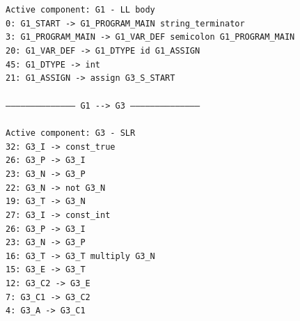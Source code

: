 \begin{priklad}
  \texttt{Active component: G1 - LL body \\
    \phantom{mm}0:\phantom{mmmmmmmmmmmm}              G1\_START -> G1\_PROGRAM\_MAIN string\_terminator \\
    \phantom{mm}3:\phantom{mmmmm}       G1\_PROGRAM\_MAIN -> G1\_VAR\_DEF semicolon G1\_PROGRAM\_MAIN \\
    \phantom{mm}20:\phantom{mmmmmmmmm}           G1\_VAR\_DEF -> G1\_DTYPE id G1\_ASSIGN \\
    \phantom{mm}45:\phantom{mmmmmmmmmmm}             G1\_DTYPE -> int \\
    \phantom{mm}21:\phantom{mmmmmmmmmm}            G1\_ASSIGN -> assign G3\_S\_START \\
  \ \\
  ------------------------------------------    G1   -\-->   G3    ------------------------------------------ \\
  \ \\ \newpage
  Active component: G3 - SLR \\
    \phantom{mm}32:\phantom{mmmmmmmmmmmmmmm}                 G3\_I -> const\_true \\
    \phantom{mm}26:\phantom{mmmmmmmmmmmmmmm}                 G3\_P -> G3\_I \\
    \phantom{mm}23:\phantom{mmmmmmmmmmmmmmm}                 G3\_N -> G3\_P \\
    \phantom{mm}22:\phantom{mmmmmmmmmmmmmmm}                 G3\_N -> not G3\_N \\
    \phantom{mm}19:\phantom{mmmmmmmmmmmmmmm}                 G3\_T -> G3\_N \\
    \phantom{mm}27:\phantom{mmmmmmmmmmmmmmm}                 G3\_I -> const\_int \\
    \phantom{mm}26:\phantom{mmmmmmmmmmmmmmm}                 G3\_P -> G3\_I \\
    \phantom{mm}23:\phantom{mmmmmmmmmmmmmmm}                 G3\_N -> G3\_P \\
    \phantom{mm}16:\phantom{mmmmmmmmmmmmmmm}                 G3\_T -> G3\_T multiply G3\_N \\
    \phantom{mm}15:\phantom{mmmmmmmmmmmmmmm}                 G3\_E -> G3\_T \\
    \phantom{mm}12:\phantom{mmmmmmmmmmmmmm}                G3\_C2 -> G3\_E \\
    \phantom{mm}7: \phantom{mmmmmmmmmmmmmm}                G3\_C1 -> G3\_C2 \\
    \phantom{mm}4: \phantom{mmmmmmmmmmmmmmm}                 G3\_A -> G3\_C1 \\
}
\end{priklad}
